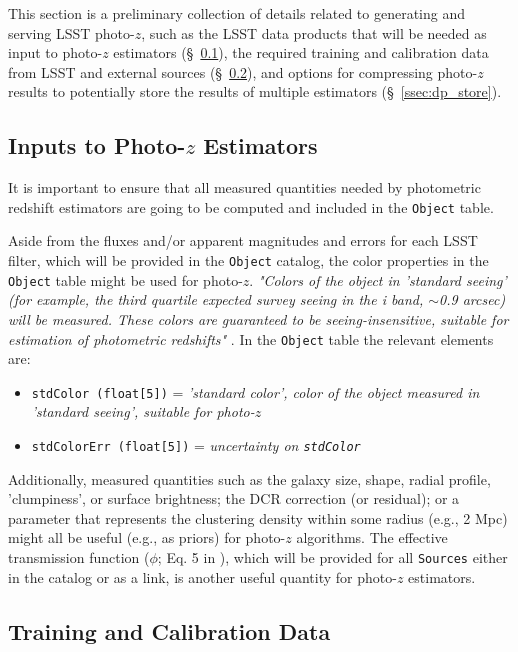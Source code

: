 \documentclass[DM,lsstdraft,toc]{lsstdoc}
\begin{document}
This section is a preliminary collection of details related to generating and serving LSST photo-$z$, such as the LSST data products that will be needed as input to photo-$z$ estimators (\S~\ref{ssec:dp_objvals}), the required training and calibration data from LSST and external sources (\S~\ref{ssec:dp_calib}), and options for compressing photo-$z$ results to potentially store the results of multiple estimators (\S~\ref{ssec:dp_store}).


\subsection{Inputs to Photo-$z$ Estimators}\label{ssec:dp_objvals}

It is important to ensure that all measured quantities needed by photometric redshift estimators are going to be computed and included in the {\tt Object} table. 

Aside from the fluxes and/or apparent magnitudes and errors for each LSST filter, which will be provided in the {\tt Object} catalog, the color properties in the {\tt Object} table might be used for photo-$z$. {\it "Colors of the object in 'standard seeing' (for example, the third quartile expected survey seeing in the i band, $\sim$0.9 arcsec) will be measured. These colors are guaranteed to be seeing-insensitive, suitable for estimation of photometric redshifts"} . In the {\tt Object} table the relevant elements are:
\vspace{-15pt}
\begin{itemize}
\item \texttt{stdColor (float[5])} = {\it 'standard color', color of the object measured in 'standard seeing', suitable for photo-$z$}
\item \texttt{stdColorErr (float[5])} = {\it uncertainty on \texttt{stdColor}}
\end{itemize}

Additionally, measured quantities such as the galaxy size, shape, radial profile, 'clumpiness', or surface brightness; the DCR correction (or residual); or a parameter that represents the clustering density within some radius (e.g., 2 Mpc) might all be useful (e.g., as priors) for photo-$z$ algorithms. The effective transmission function ($\phi$; Eq. 5 in ), which will be provided for all {\tt Sources} either in the catalog or as a link, is another useful quantity for photo-$z$ estimators.


\subsection{Training and Calibration Data}\label{ssec:dp_calib}
\end{document}
